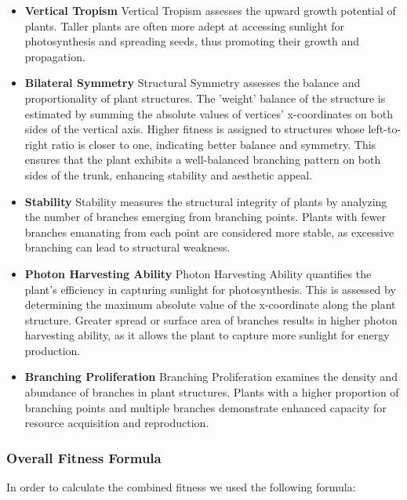 \begin{itemize}
\item \textbf{Vertical Tropism}
Vertical Tropism assesses the upward growth potential of plants. Taller plants are often more adept at accessing sunlight for photosynthesis and spreading seeds, thus promoting their growth and propagation\cite{d9683286-f374-3c0d-ae3c-3924235e199a}.

\item \textbf{Bilateral Symmetry}
Structural Symmetry assesses the balance and proportionality of plant structures. The 'weight' balance of the structure is estimated by summing the absolute values of vertices' x-coordinates on both sides of the vertical axis. Higher fitness is assigned to structures whose left-to-right ratio is closer to one, indicating better balance and symmetry. This ensures that the plant exhibits a well-balanced branching pattern on both sides of the trunk, enhancing stability and aesthetic appeal.

\item \textbf{Stability}
Stability measures the structural integrity of plants by analyzing the number of branches emerging from branching points. Plants with fewer branches emanating from each point are considered more stable, as excessive branching can lead to structural weakness.

\item \textbf{Photon Harvesting Ability}
Photon Harvesting Ability quantifies the plant's efficiency in capturing sunlight for photosynthesis. This is assessed by determining the maximum absolute value of the x-coordinate along the plant structure. Greater spread or surface area of branches results in higher photon harvesting ability, as it allows the plant to capture more sunlight for energy production.

\item \textbf{Branching Proliferation}
Branching Proliferation examines the density and abundance of branches in plant structures. Plants with a higher proportion of branching points and multiple branches demonstrate enhanced capacity for resource acquisition and reproduction.
\end{itemize}

\subsubsection*{Overall Fitness Formula}
In order to calculate the combined fitness we used the following formula:
\\

